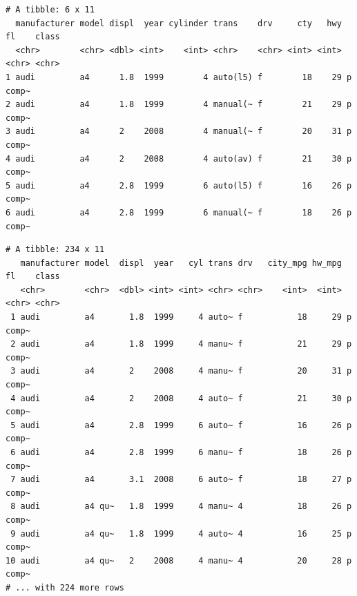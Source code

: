 \documentclass[
  11pt,
]{krantz}
\newenvironment{Shaded}{\begin{snugshade}}{\end{snugshade}}
\newcommand{\CommentTok}[1]{\textcolor[rgb]{0.37,0.37,0.37}{\textit{#1}}}
\newcommand{\DataTypeTok}[1]{\textcolor[rgb]{0.27,0.27,0.27}{#1}}
\newcommand{\KeywordTok}[1]{\textcolor[rgb]{0.27,0.27,0.27}{\textbf{#1}}}
\newcommand{\NormalTok}[1]{#1}
\newcommand{\OperatorTok}[1]{\textcolor[rgb]{0.43,0.43,0.43}{\textbf{#1}}}
\newcommand{\StringTok}[1]{\textcolor[rgb]{0.5,0.5,0.5}{#1}}
\begin{document}
\begin{verbatim}
# A tibble: 6 x 11
  manufacturer model displ  year cylinder trans    drv     cty   hwy fl    class
  <chr>        <chr> <dbl> <int>    <int> <chr>    <chr> <int> <int> <chr> <chr>
1 audi         a4      1.8  1999        4 auto(l5) f        18    29 p     comp~
2 audi         a4      1.8  1999        4 manual(~ f        21    29 p     comp~
3 audi         a4      2    2008        4 manual(~ f        20    31 p     comp~
4 audi         a4      2    2008        4 auto(av) f        21    30 p     comp~
5 audi         a4      2.8  1999        6 auto(l5) f        16    26 p     comp~
6 audi         a4      2.8  1999        6 manual(~ f        18    26 p     comp~
\end{verbatim}

\begin{Shaded}
\end{Shaded}

\begin{verbatim}
# A tibble: 234 x 11
   manufacturer model  displ  year   cyl trans drv   city_mpg hw_mpg fl    class
   <chr>        <chr>  <dbl> <int> <int> <chr> <chr>    <int>  <int> <chr> <chr>
 1 audi         a4       1.8  1999     4 auto~ f           18     29 p     comp~
 2 audi         a4       1.8  1999     4 manu~ f           21     29 p     comp~
 3 audi         a4       2    2008     4 manu~ f           20     31 p     comp~
 4 audi         a4       2    2008     4 auto~ f           21     30 p     comp~
 5 audi         a4       2.8  1999     6 auto~ f           16     26 p     comp~
 6 audi         a4       2.8  1999     6 manu~ f           18     26 p     comp~
 7 audi         a4       3.1  2008     6 auto~ f           18     27 p     comp~
 8 audi         a4 qu~   1.8  1999     4 manu~ 4           18     26 p     comp~
 9 audi         a4 qu~   1.8  1999     4 auto~ 4           16     25 p     comp~
10 audi         a4 qu~   2    2008     4 manu~ 4           20     28 p     comp~
# ... with 224 more rows
\end{verbatim}

\normalsize
\end{document}
